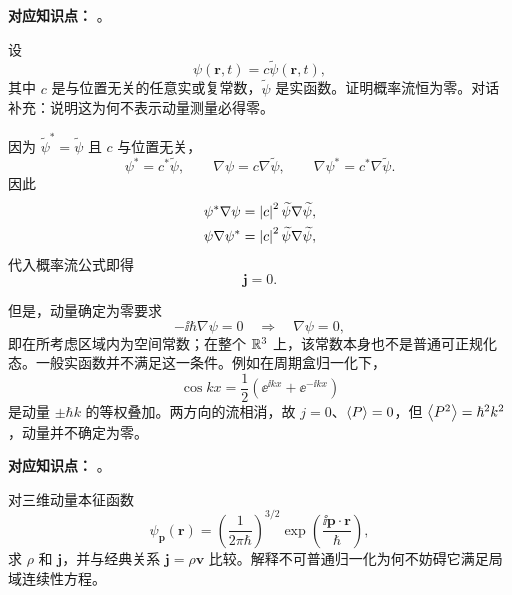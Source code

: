 
\textbf{对应知识点：}
。

设
\begin{equation}
  \psi(\mathbf r,t)=c\widetilde\psi(\mathbf r,t),
  \label{eq:QM-C05-S03-E02-state}
\end{equation}
其中 $c$ 是与位置无关的任意实或复常数，$\widetilde\psi$ 是实函数。证明概率流恒为零。对话补充：说明这为何不表示动量测量必得零。

\begin{checkedsolution}
因为 $\widetilde\psi^*=\widetilde\psi$ 且 $c$ 与位置无关，
\begin{equation}
  \psi^*=c^*\widetilde\psi,
  \qquad
  \nabla\psi=c\nabla\widetilde\psi,
  \qquad
  \nabla\psi^*=c^*\nabla\widetilde\psi.
  \label{eq:QM-C05-S03-E02-conjugates}
\end{equation}
因此
\begin{align}
  \psi^*\nabla\psi
  &=\left|c\right|^2\widetilde\psi\nabla\widetilde\psi,\\
  \psi\nabla\psi^*
  &=\left|c\right|^2\widetilde\psi\nabla\widetilde\psi,
\end{align}
代入概率流公式即得
\begin{equation}
  \boxed{\mathbf j=0}.
  \label{eq:QM-C05-S03-E02-zero-current}
\end{equation}

但是，动量确定为零要求
\begin{equation}
  -\ii\hbar\nabla\psi=0
  \quad\Longrightarrow\quad
  \nabla\psi=0,
  \label{eq:QM-C05-S03-E02-zero-momentum-condition}
\end{equation}
即在所考虑区域内为空间常数；在整个 $\mathbb{R}^3$ 上，该常数本身也不是普通可正规化态。一般实函数并不满足这一条件。例如在周期盒归一化下，
\begin{equation}
  \cos kx=\frac12
  (\ee^{\ii kx}+\ee^{-\ii kx})
  \label{eq:QM-C05-S03-E02-cosine-superposition}
\end{equation}
是动量 $\pm\hbar k$ 的等权叠加。两方向的流相消，故 $j=0$、$\left\langle P \right\rangle=0$，但 $\left\langle P^2 \right\rangle=\hbar^2k^2$，动量并不确定为零。
\end{checkedsolution}


\textbf{对应知识点：}
。

对三维动量本征函数
\begin{equation}
  \psi_{\mathbf p}(\mathbf r)
  =\left(\frac{1}{2\pi\hbar}\right)^{3/2}
  \exp\left(\frac{\ii\mathbf p\cdot\mathbf r}{\hbar}\right),
  \label{eq:QM-C05-S03-E03-plane-wave}
\end{equation}
求 $\rho$ 和 $\mathbf j$，并与经典关系 $\mathbf j=\rho\mathbf v$ 比较。解释不可普通归一化为何不妨碍它满足局域连续性方程。

